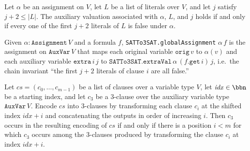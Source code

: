 \begin{lemma}
\label{SATTo3SAT.extraVal_iff_prefix_all_false}
\leanok
{}
Let $\alpha$ be an assignment on $V$, let $L$ be a list of literals over $V$, and let
$j$ satisfy $j+2\le |L|$. The auxiliary valuation associated with $\alpha$, $L$, and $j$
holds if and only if every one of the first $j+2$ literals of $L$ is false under
$\alpha$.
\end{lemma}

\begin{definition}
\label{SATTo3SAT.globalAssignment}
\leanok
{}
Given $\alpha : \mathtt{Assignment}\,V$ and a formula $f$, \texttt{SATTo3SAT.globalAssignment}
$\alpha\,f$ is the assignment on $\mathtt{AuxVar}\,V$ that maps each original variable
$\mathtt{orig}\,v$ to $\alpha(v)$ and each auxiliary variable $\mathtt{extra}\,i\,j$ to
$\texttt{SATTo3SAT.extraVal}\,\alpha\,(f.\mathtt{get}\,i)\,j$, i.e.\ the chain invariant
``the first $j+2$ literals of clause $i$ are all false.''
\end{definition}

\begin{lemma}
\label{SATTo3SAT.mem_to3SATAux_iff}
\leanok
{}
Let $\mathit{cs} = (c_0,\dots,c_{m-1})$ be a list of clauses over a variable type $V$,
let $\mathit{idx} \in \bbn$ be a starting index, and let $c_3$ be a 3-clause over the
auxiliary variable type $\mathtt{AuxVar}\,V$. Encode $\mathit{cs}$ into 3-clauses by
transforming each clause $c_i$ at the shifted index $\mathit{idx}+i$ and concatenating
the outputs in order of increasing $i$. Then $c_3$ occurs in the resulting encoding of
$\mathit{cs}$ if and only if there is a position $i < m$ for which $c_3$ occurs among
the 3-clauses produced by transforming the clause $c_i$ at index $\mathit{idx}+i$.
\end{lemma}

